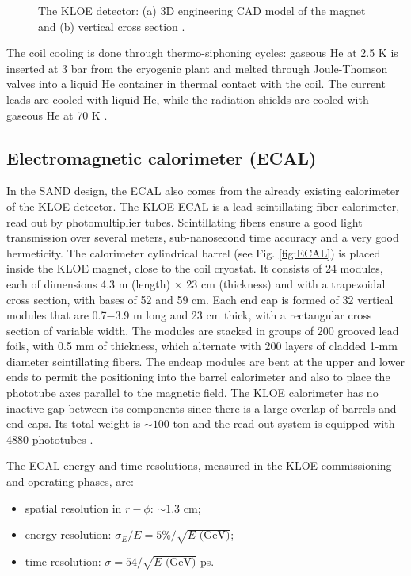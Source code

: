 \begin{figure}
    \centering
    \caption{The KLOE detector: (a) 3D engineering CAD model of the magnet and (b) vertical cross section \cite{KLOE-det}.}
    \label{fig:magnet}
\end{figure}

The coil cooling is done through thermo-siphoning cycles: gaseous He at 2.5 K is inserted at 3 bar from the cryogenic plant and melted through Joule-Thomson valves into a liquid He container in thermal contact with the coil. The current leads are cooled with liquid He, while the radiation shields are cooled with gaseous He at 70 K \cite{nd_cdr}.

\subsection{Electromagnetic calorimeter (ECAL)}
In the SAND design, the ECAL also comes from the already existing calorimeter of the KLOE detector. The KLOE ECAL is a lead-scintillating fiber calorimeter, read out by photomultiplier tubes. Scintillating fibers ensure a good light transmission over several meters, sub-nanosecond time accuracy and a very good hermeticity. The calorimeter cylindrical barrel (see Fig. \ref{fig:ECAL}) is placed inside the KLOE magnet, close to the coil cryostat. It consists of 24 modules, each of dimensions 4.3 m (length) $\times$ 23 cm (thickness) and with a trapezoidal cross section, with bases of 52 and 59 cm. Each end cap is formed of 32 vertical modules that are 0.7$-$3.9 m long and 23 cm thick, with a rectangular cross section of variable width. The modules are stacked in groups of 200 grooved lead foils, with 0.5 mm of thickness, which alternate with 200 layers of cladded 1-mm diameter scintillating fibers. The endcap modules are bent at the upper and lower ends to permit the positioning into the barrel calorimeter and also to place the phototube axes parallel to the magnetic field. The KLOE calorimeter has no inactive gap between its components since there is a large overlap of barrels and end-caps. Its total weight is $\sim 100$ ton and the read-out system is equipped with 4880 phototubes \cite{KLOE-det}.

The ECAL energy and time resolutions, measured in the KLOE commissioning and operating phases, are: %
\begin{itemize}
    \item spatial resolution in $r - \phi$: $\sim 1.3$ cm;
    \item energy resolution: $\sigma_E/E = 5\%/\sqrt{E\text{ (GeV)}}$;
    \item time resolution: $\sigma = 54/ \sqrt{E\text{ (GeV)}}$ ps.
\end{itemize}

